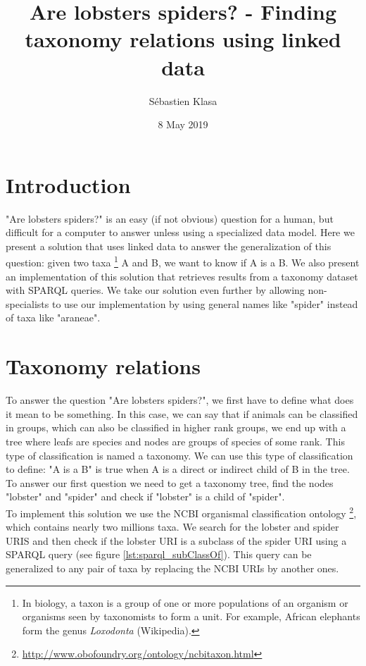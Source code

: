 \documentclass{article}
\title{Are lobsters spiders? - Finding taxonomy relations using linked data}
\author{Sébastien Klasa}
\date{8 May 2019}
\begin{document}
\maketitle

\section{Introduction}

"Are lobsters spiders?" is an easy (if not obvious) question for a human, but difficult for a computer to answer unless using a specialized data model. Here we present a solution that uses linked data to answer the generalization of this question: given two taxa \footnote{In biology, a taxon is a group of one or more populations of an organism or organisms seen by taxonomists to form a unit. For example, African elephants form the genus \textit{Loxodonta} (Wikipedia).} A and B, we want to know if A is a B. We also present an implementation of this solution that retrieves results from a taxonomy dataset with SPARQL queries. We take our solution even further by allowing non-specialists to use our implementation by using general names like "spider" instead of taxa like "araneae".

\section{Taxonomy relations}
\label{sec:taxonomy_relations}

To answer the question "Are lobsters spiders?", we first have to define what does it mean to be something. In this case, we can say that if animals can be classified in groups, which can also be classified in higher rank groups, we end up with a tree where leafs are species and nodes are groups of species of some rank. This type of classification is named a taxonomy. We can use this type of classification to define: "A is a B" is true when A is a direct or indirect child of B in the tree. To answer our first question we need to get a taxonomy tree, find the nodes "lobster" and "spider" and check if "lobster" is a child of "spider".
\\

To implement this solution we use the NCBI organismal classification ontology \footnote{\url{http://www.obofoundry.org/ontology/ncbitaxon.html}}, which contains nearly two millions taxa. We search for the lobster and spider URIS and then check if the lobster URI is a subclass of the spider URI using a SPARQL query (see figure \ref{lst:sparql_subClassOf}). This query can be generalized to any pair of taxa by replacing the NCBI URIs by another ones.
\end{document}
